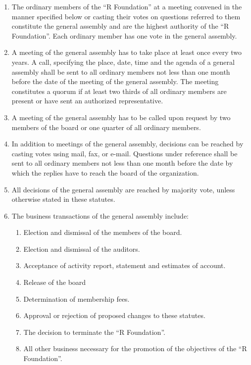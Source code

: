 \documentclass[a4paper]{article}
\newcommand{\RF}{``R Foundation''}
\begin{document}
\begin{enumerate}
 \item The ordinary members of the \RF{} at a meeting convened in the
  manner specified below or casting their votes on questions referred
  to them constitute the general assembly and are the highest
  authority of the \RF{}. Each ordinary member has one vote in the
  general assembly.
  
 \item A meeting of the general assembly has to take place at least
  once every two years. A call, specifying the place, date, time and
  the agenda of a general assembly shall be sent to all ordinary
  members not less than one month before the date of the meeting of
  the general assembly. The meeting constitutes a quorum if at least
  two thirds of all ordinary members are present or have sent an
  authorized representative.
  
 \item A meeting of the general assembly has to be called upon request
  by two members of the board or one quarter of all ordinary members. 
  
 \item In addition to meetings of the general assembly, decisions can
  be reached by casting votes using mail, fax, or e-mail. Questions
  under reference shall be sent to all ordinary members not less than
  one month before the date by which the replies have to reach the
  board of the organization.
  
 \item All decisions of the general assembly are reached by majority
  vote, unless otherwise stated in these statutes.
  
 \item The business transactions of the general assembly include:
  \begin{enumerate}
   \item Election and dismissal of the members of the board.
   \item Election and dismissal of the auditors.
   \item Acceptance of activity report, statement and estimates of
    account.
   \item Release of the board
   \item Determination of membership fees.
   \item Approval or rejection of proposed changes to these statutes.
   \item The decision to terminate the \RF{}.
   \item All other business necessary for the promotion of the
    objectives of the \RF{}.
  \end{enumerate}
\end{enumerate}
\end{document}
